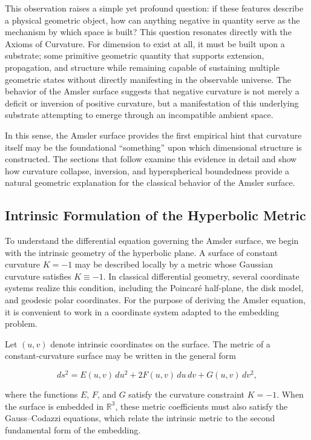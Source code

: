 \documentclass[final,onefignum,onetabnum]{siamart}
\begin{document}
This observation raises a simple yet profound question: if these features describe a physical geometric object, how can anything negative in quantity serve as the mechanism by which space is built? This question resonates directly with the Axioms of Curvature. For dimension to exist at all, it must be built upon a substrate; some primitive geometric quantity that supports extension, propagation, and structure while remaining capable of sustaining multiple geometric states without directly manifesting in the observable universe. The behavior of the Amsler surface suggests that negative curvature is not merely a deficit or inversion of positive curvature, but a manifestation of this underlying substrate attempting to emerge through an incompatible ambient space.

In this sense, the Amsler surface provides the first empirical hint that curvature itself may be the foundational “something” upon which dimensional structure is constructed. The sections that follow examine this evidence in detail and show how curvature collapse, inversion, and hyperspherical boundedness provide a natural geometric explanation for the classical behavior of the Amsler surface.

\subsection{Intrinsic Formulation of the Hyperbolic Metric}

To understand the differential equation governing the Amsler surface, we begin with the intrinsic geometry of the hyperbolic plane. A surface of constant curvature $K = -1$ may be described locally by a metric whose Gaussian curvature satisfies $K \equiv -1$. In classical differential geometry, several coordinate systems realize this condition, including the Poincaré half‑plane, the disk model, and geodesic polar coordinates. For the purpose of deriving the Amsler equation, it is convenient to work in a coordinate system adapted to the embedding problem.

Let $(u,v)$ denote intrinsic coordinates on the surface. The metric of a constant‑curvature surface may be written in the general form


\[
ds^2 = E(u,v)\,du^2 + 2F(u,v)\,du\,dv + G(u,v)\,dv^2,
\]


where the functions $E$, $F$, and $G$ satisfy the curvature constraint $K = -1$. When the surface is embedded in $\mathbb{R}^3$, these metric coefficients must also satisfy the Gauss–Codazzi equations, which relate the intrinsic metric to the second fundamental form of the embedding.
\end{document}
